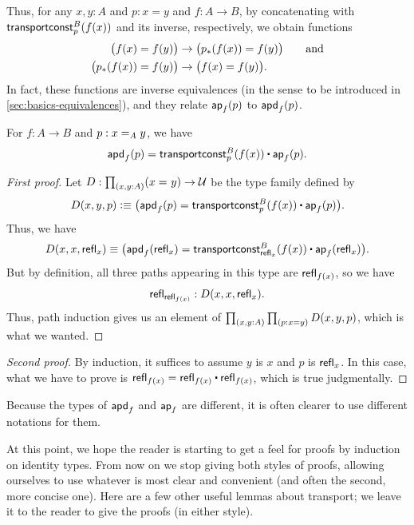 Thus, for any $x,y:A$ and $p:x=y$ and $f:A\to B$, by concatenating with $\transconst Bp{f(x)}$ and its inverse, respectively, we obtain functions
\begin{align}
  \big(f(x) = f(y)\big) &\to \big(\trans{p}{f(x)} = f(y)\big)\label{eq:ap-to-apd}
  \qquad\text{and} \\
  \big(\trans{p}{f(x)} = f(y)\big) &\to \big(f(x) = f(y)\big).\label{eq:apd-to-ap}
\end{align}
In fact, these functions are inverse equivalences (in the sense to be introduced in \cref{sec:basics-equivalences}), and they relate $\apfunc f (p)$  to $\apdfunc f (p)$.

\begin{lem}\label{thm:apd-const}
  For $f:A\to B$ and $p:\id[A]xy$, we have
  \[ \apdfunc f(p) = \transconst B p{f(x)} \ct \apfunc f (p). \]
\end{lem}
\begin{proof}[First proof]
  Let $D:\prd{x,y:A} (\id xy) \to \type$ be the type family defined by
  \[ D(x,y,p) \defeq \big(\apdfunc f (p) = \transconst Bp{f(x)} \ct \apfunc f (p)\big). \]
  Thus, we have
  \[D(x,x,\refl x) \jdeq \big(\apdfunc f (\refl x) = \transconst B{\refl x}{f(x)} \ct \apfunc f ({\refl x})\big).\]
  But by definition, all three paths appearing in this type are $\refl{f(x)}$, so we have
  \[ \refl{\refl{f(x)}} : D(x,x,\refl x). \]
  Thus, path induction gives us an element of $\prd{x,y:A}{p:x=y} D(x,y,p)$, which is what we wanted.
\end{proof}
\begin{proof}[Second proof]
  By induction, it suffices to assume $y$ is $x$ and $p$ is $\refl x$.
  In this case, what we have to prove is $\refl{f(x)} = \refl{f(x)} \ct \refl{f(x)}$, which is true judgmentally.
\end{proof}

Because the types of $\apdfunc{f}$ and $\apfunc{f}$ are different, it is often clearer to use different notations for them.

%

At this point, we hope the reader is starting to get a feel for proofs by induction on identity types.
From now on we stop giving both styles of proofs, allowing ourselves to use whatever is most clear and convenient (and often the second, more concise one).
Here are a few other useful lemmas about transport; we leave it to the reader to give the proofs (in either style).

